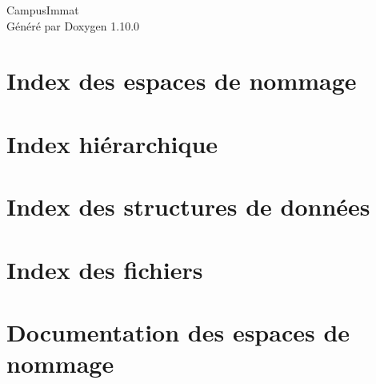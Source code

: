 \documentclass[twoside]{book}
\newcommand{\+}{\discretionary{\mbox{\scriptsize$\hookleftarrow$}}{}{}}
\newcommand{\clearemptydoublepage}{%
    \newpage{\pagestyle{empty}\cleardoublepage}%
  }
\begin{document}
  \raggedbottom
    \hypersetup{pageanchor=false,
                bookmarksnumbered=true,
                pdfencoding=unicode
               }
  \begin{titlepage}
  \vspace*{7cm}
  \begin{center}%
  {\Large Campus\+Immat}\\
  \vspace*{1cm}
  {\large Généré par Doxygen 1.10.0}\\
  \end{center}
  \end{titlepage}
  \clearemptydoublepage
  \tableofcontents
  \clearemptydoublepage
  \hypersetup{pageanchor=true}

\chapter{Index des espaces de nommage}

\chapter{Index hiérarchique}

\chapter{Index des structures de données}

\chapter{Index des fichiers}

\chapter{Documentation des espaces de nommage}










\end{document}
